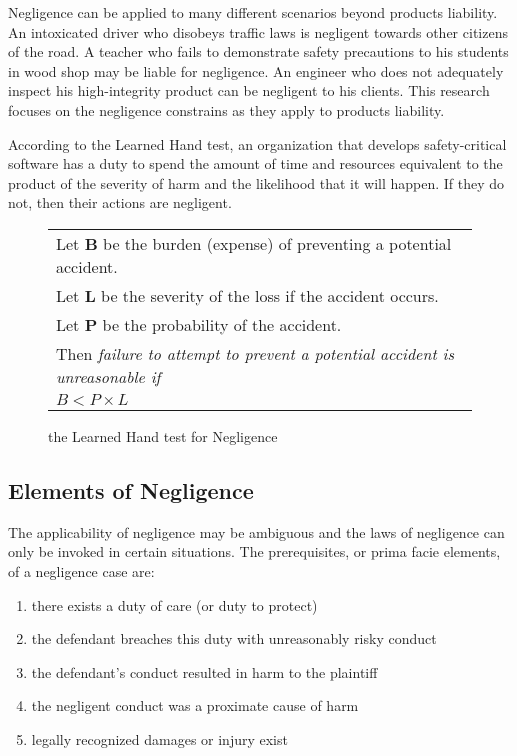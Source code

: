 Negligence can be applied to many different scenarios beyond products
liability. An intoxicated driver who disobeys traffic laws is negligent towards
other citizens of the road. A teacher who fails to demonstrate safety
precautions to his students in wood shop may be liable for negligence. An
engineer who does not adequately inspect his high-integrity product can be
negligent to his clients. This research focuses on the negligence constrains as
they apply to products liability.

According to the Learned Hand test, an organization that develops 
safety-critical software has a duty to spend the amount of time and resources
equivalent to the product of the severity of harm and the likelihood that it
will happen. If they do not, then their actions are negligent.

\begin{figure}
\begin{narrow}{-1.5in}{-1.5in}\begin{center}
\begin{tabular}{|l|}
\hline
	Let \textbf{B} be the burden (expense) of preventing a potential accident.\\
	Let \textbf{L} be the severity of the loss if the accident occurs.\\
	Let \textbf{P} be the probability of the accident.\\[6pt]
	Then \textit{failure to attempt to prevent a potential accident is 
	unreasonable if}\\[8pt]

      \centerline{\(B < P \times L\)}
\\[3pt]
\hline
\end{tabular}
\end{center}\end{narrow}
\caption{the Learned Hand test for Negligence}
\label{fig:handtest}
\end{figure}

\subsection{Elements of Negligence}
The applicability of negligence may be ambiguous and the laws of negligence can
only be invoked in certain situations. The prerequisites, or prima facie
elements, of a negligence case are:

\singlespace
\begin{enumerate}
 \item there exists a duty of care (or duty to protect)
 \item the defendant breaches this duty with unreasonably risky conduct
 \item the defendant's conduct resulted in harm to the plaintiff
 \item the negligent conduct was a proximate cause of harm
 \item legally recognized damages or injury exist
\end{enumerate}
\doublespace

